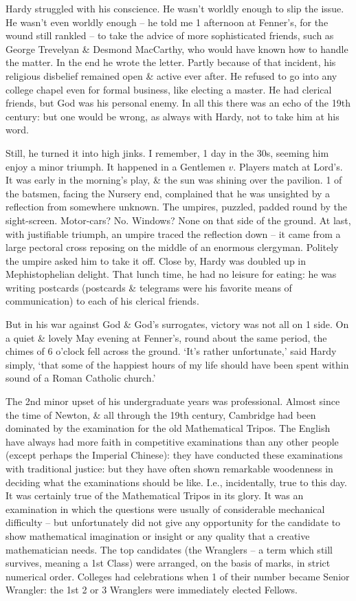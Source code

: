 \documentclass{article}
\numberwithin{equation}{section}
\begin{document}
Hardy struggled with his conscience. He wasn't worldly enough to slip the issue. He wasn't even worldly enough -- he told me 1 afternoon at Fenner's, for the wound still rankled -- to take the advice of more sophisticated friends, such as George Trevelyan \& Desmond MacCarthy, who would have known how to handle the matter. In the end he wrote the letter. Partly because of that incident, his religious disbelief remained open \& active ever after. He refused to go into any college chapel even for formal business, like electing a master. He had clerical friends, but God was his personal enemy. In all this there was an echo of the 19th century: but one would be wrong, as always with Hardy, not to take him at his word.

Still, he turned it into high jinks. I remember, 1 day in the 30s, seeming him enjoy a minor triumph. It happened in a Gentlemen $v$. Players match at Lord's. It was early in the morning's play, \& the sun was shining over the pavilion. 1 of the batsmen, facing the Nursery end, complained that he was unsighted by a reflection from somewhere unknown. The umpires, puzzled, padded round by the sight-screen. Motor-cars? No. Windows? None on that side of the ground. At last, with justifiable triumph, an umpire traced the reflection down -- it came from a large pectoral cross reposing on the middle of an enormous clergyman. Politely the umpire asked him to take it off. Close by, Hardy was doubled up in Mephistophelian delight. That lunch time, he had no leisure for eating: he was writing postcards (postcards \& telegrams were his favorite means of communication) to each of his clerical friends.

But in his war against God \& God's surrogates, victory was not all on 1 side. On a quiet \& lovely May evening at Fenner's, round about the same period, the chimes of 6 o'clock fell across the ground. `It's rather unfortunate,' said Hardy simply, `that some of the happiest hours of my life should have been spent within sound of a Roman Catholic church.'

The 2nd minor upset of his undergraduate years was professional. Almost since the time of Newton, \& all through the 19th century, Cambridge had been dominated by the examination for the old Mathematical Tripos. The English have always had more faith in competitive examinations than any other people (except perhaps the Imperial Chinese): they have conducted these examinations with traditional justice: but they have often shown remarkable woodenness in deciding what the examinations should be like. I.e., incidentally, true to this day. It was certainly true of the Mathematical Tripos in its glory. It was an examination in which the questions were usually of considerable mechanical difficulty -- but unfortunately did not give any opportunity for the candidate to show mathematical imagination or insight or any quality that a creative mathematician needs. The top candidates (the Wranglers -- a term which still survives, meaning a 1st Class) were arranged, on the basis of marks, in strict numerical order. Colleges had celebrations when 1 of their number became Senior Wrangler: the 1st 2 or 3 Wranglers were immediately elected Fellows.
\end{document}
